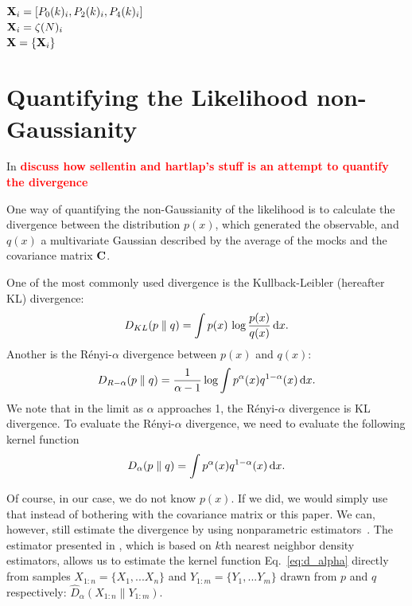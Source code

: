 \documentclass[12pt, letterpaper, preprint]{aastex}
\newcommand{\beq}{\begin{equation}}
\newcommand{\eeq}{\end{equation}}
\newcommand{\todo}[1]{{\bf \textcolor{red}{#1}}}
\begin{document}
\subsection{}
${\bf X}_i = [P_0(k)_i,P_2(k)_i,P_4(k)_i]$ \\
${\bf X}_i = \zeta(N)_i$ \\ 
${\bf X} = \{{\bf X}_i\}$


\section{Quantifying the Likelihood non-Gaussianity}
In \cite{sellentin2017} \todo{discuss how sellentin and hartlap's stuff is an attempt to quantify the divergence} 

One way of quantifying the non-Gaussianity of the likelihood is to 
calculate the divergence between the distribution $p(x)$, which generated
the observable, and $q(x)$ a multivariate Gaussian described by the average
of the mocks and the covariance matrix ${\bf C}$.

One of the most commonly used divergence is the Kullback-Leibler 
(hereafter KL) divergence: 
\beq \label{eq:kl} 
D_{KL} ( p \parallel q ) = \int p(x)\,\log \frac{p(x)}{q(x)}\,{\rm d}x. 
\eeq
Another is the R\'enyi-$\alpha$ divergence between $p(x)$ and $q(x)$:
\beq \label{eq:renyi}
D_{R-\alpha} ( p \parallel q ) = \frac{1}{\alpha -1} \log \int p^\alpha(x) q^{1 -\alpha}(x)\,{\rm d}x. 
\eeq
We note that in the limit as $\alpha$ approaches 1, the R\'enyi-$\alpha$ 
divergence is KL divergence.
To evaluate the R\'enyi-$\alpha$ divergence, we need to evaluate the following
kernel function
\beq \label{eq:d_alpha}
D_{\alpha} ( p \parallel q ) = \int p^\alpha(x) q^{1-\alpha}(x)\,{\rm d}x. 
\eeq

Of course, in our case, we do not know $p(x)$. If we did, we would simply 
use that instead of bothering with the covariance matrix or this paper. We can,
however, still estimate the divergence by using nonparametric estimators~\citep{wang2009, poczos2012, krishnamurthy2014}. 
The estimator presented in 
\cite{poczos2012}, which is based on $k$th nearest neighbor density estimators, 
allows us to estimate the kernel function Eq.~\ref{eq:d_alpha} 
directly from samples $X_{1:n} = \{ X_1, ... X_n \}$ and $Y_{1:m} = \{ Y_1, ... Y_m \}$ 
drawn from $p$ and $q$ respectively: $\hat{D}_{\alpha}(X_{1:n} \parallel Y_{1:m})$. 
\end{document}

